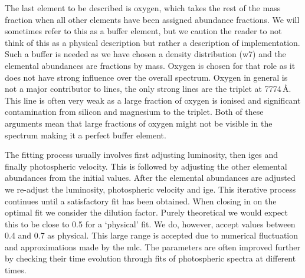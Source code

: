 The last element to be described is oxygen, which takes the rest of the mass fraction when all other elements have been assigned abundance fractions. We will sometimes refer to this as a buffer element, but we caution the reader to not think of this as a physical description but rather a description of implementation. Such a buffer is needed as we have chosen a density distribution (\gls{w7}) and the elemental abundances are fractions by mass. Oxygen is chosen for that role as it does not have strong influence over the overall spectrum. Oxygen in general is not a major contributor to lines, the only strong lines are the  triplet at 7774\,\AA. This line is often very weak as a large fraction of oxygen is ionised and significant contamination from silicon and magnesium to the triplet. Both of these arguments mean that large fractions of oxygen might not be visible in the spectrum making it a perfect buffer element. 


The fitting process usually involves first adjusting luminosity, then \glspl{ige} and finally photospheric velocity. This is followed by adjusting the other elemental abundances from the initial values. After the elemental abundances are adjusted we re-adjust the luminosity, photospheric velocity and \gls{ige}. This iterative process continues until a satisfactory fit has been obtained. When closing in on the optimal fit we consider the dilution factor. Purely theoretical we would expect this to be close to 0.5 for a `physical' fit. We do, however, accept values between 0.4 and 0.7 as physical. This large range is accepted due to numerical fluctuation and approximations made by the \gls{mlc}. The parameters are often improved further by checking their time evolution through fits of photospheric spectra at different times.






